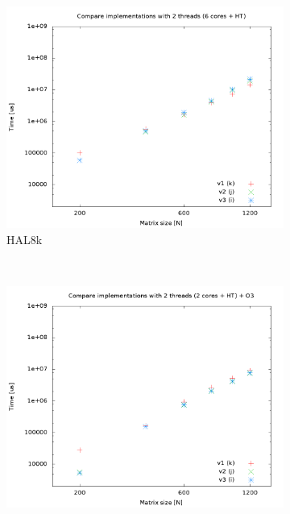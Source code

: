 \documentclass[a4paper, 12pt]{article}
\begin{document}
\begin{figure}[H]
    \centering
    \begin{subfigure}[H]{0.5\textwidth}
        \includegraphics[width=\textwidth]{HAL_cmp_versions-2t}
        \caption{HAL8k}
        \label{fig:8k_cmp_2t}
    \end{subfigure}%
    ~ %
    \begin{subfigure}[H]{0.5\textwidth}
        \includegraphics[width=\textwidth]{hpops2_O3_cmp_versions-2t}

\end{subfigure}
\end{figure}
\end{document}

